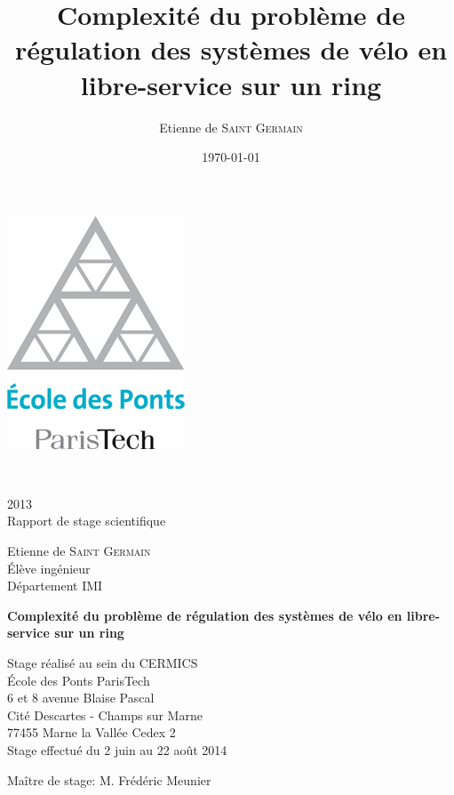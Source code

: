 \documentclass[twoside,11pt,openany,a4paper]{rapport}
\begin{document}
\title{Complexité du problème de régulation des systèmes de vélo en libre-service sur un ring}
\author{Etienne de \textsc{Saint Germain}}
\date{\today}

\mainmatter

\begin{titlepage}
  \begin{center}
    \includegraphics[scale=0.5]{logo_enpc.jpg}
    
    \vspace{0.3cm}
    \\
    
    \vspace{0.7cm}
    2013\\
    Rapport de stage scientifique
    
    \vspace{0.3cm}
    Etienne de \textsc{Saint Germain}\\
    Élève ingénieur\\
    Département IMI
    
    \vspace{2cm}
    {\Huge{\textbf{Complexité du problème de régulation des systèmes de vélo en libre-service sur un ring}}}
    
    \vfill
    {\huge{Stage réalisé au sein du CERMICS}}\\
    École des Ponts ParisTech\\
    6 et 8 avenue Blaise Pascal\\
    Cité Descartes - Champs sur Marne\\
    77455 Marne la Vallée Cedex 2\\

    \vspace{0.7cm}
    Stage effectué du 2 juin au 22 août 2014
    
    \vspace{0.3cm}
    Maître de stage: M. Frédéric Meunier

  \end{center}
\end{titlepage}
\end{document}
